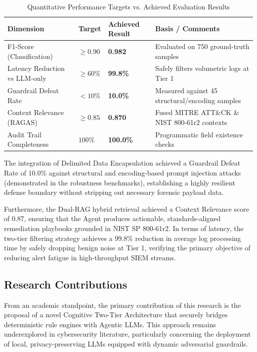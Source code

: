 \documentclass[12pt,a4paper]{article}
\begin{document}
\begin{table}[H]
    \centering
    \caption{Quantitative Performance Targets vs. Achieved Evaluation Results}
    \label{tab:targets}
    \begin{tabular}{llll}
        \toprule
        \textbf{Dimension}            & \textbf{Target} & \textbf{Achieved Result} & \textbf{Basis / Comments}                              \\
        \midrule
        F1-Score (Classification)     & $\geq 0.90$     & \textbf{0.982}           & Evaluated on 750 ground-truth samples                  \\
        Latency Reduction vs LLM-only & $\geq 60\%$     & \textbf{99.8\%}          & Safely filters volumetric logs at Tier 1               \\
        Guardrail Defeat Rate         & $< 10\%$        & \textbf{10.0\%}          & Measured against 45 structural/encoding samples        \\
        Context Relevance (RAGAS)     & $\geq 0.85$     & \textbf{0.870}           & Fused MITRE ATT\&CK \& NIST 800-61r2 contexts          \\
        Audit Trail Completeness      & $100\%$         & \textbf{100.0\%}         & Programmatic field existence checks                    \\
        \bottomrule
    \end{tabular}
\end{table}

The integration of Delimited Data Encapsulation achieved a Guardrail Defeat Rate of 10.0\% against structural and encoding-based prompt injection attacks (demonstrated in the robustness benchmarks), establishing a highly resilient defense boundary without stripping out necessary forensic payload data.

Furthermore, the Dual-RAG hybrid retrieval achieved a Context Relevance score of 0.87, ensuring that the Agent produces actionable, standards-aligned remediation playbooks grounded in NIST SP 800-61r2. In terms of latency, the two-tier filtering strategy achieves a 99.8\% reduction in average log processing time by safely dropping benign noise at Tier 1, verifying the primary objective of reducing alert fatigue in high-throughput SIEM streams.

\subsection{Research Contributions}
From an academic standpoint, the primary contribution of this research is the proposal of a novel Cognitive Two-Tier Architecture that securely bridges deterministic rule engines with Agentic LLMs. This approach remains underexplored in cybersecurity literature, particularly concerning the deployment of local, privacy-preserving LLMs equipped with dynamic adversarial guardrails.
\end{document}
